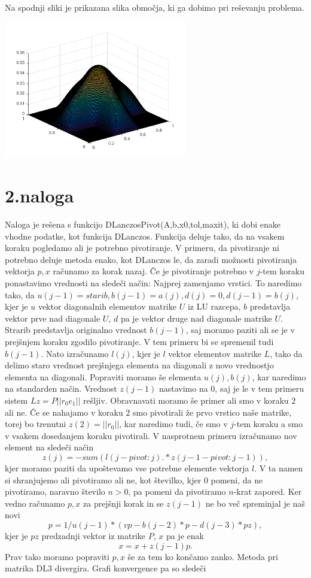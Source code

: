 \documentclass[11pt]{article} %
\begin{document}
Na spodnji sliki je prikazana slika območja, ki ga dobimo pri reševanju problema.

\includegraphics[width=0.6\textwidth]{slika1}

\section{2.naloga}

Naloga je rešena s funkcijo DLanczosPivot(A,b,x0,tol,maxit), ki dobi enake vhodne podatke, kot funkcija DLanczos. Funkcija deluje tako, da na vsakem koraku pogledamo ali je potrebno pivotiranje. V primeru, da pivotiranje ni potrebno deluje metoda enako, kot DLanczos le, da zaradi možnosti pivotiranja vektorja $p,x$ računamo za korak nazaj. Če je pivotiranje potrebno v $j$-tem koraku ponastavimo vrednosti na sledeči način:
Najprej zamenjamo vrstici. To naredimo tako, da
$u(j-1) = starib, b(j-1) = a(j), d(j) = 0, d(j-1)= b(j)$, kjer je $u$ vektor diagonalnih elementov matrike $U$ iz LU razcepa, $b$ predstavlja vektor prve nad diagonale $U$, $d$ pa je vektor druge nad diagonale matrike $U$. Strarib predstavlja originalno vrednost $b(j-1)$, saj moramo paziti ali se je v prejšnjem koraku zgodilo pivotiranje. V tem primeru bi se spremenil tudi $b(j-1)$. Nato izračunamo $l(j)$, kjer je $l$ vektor elementov matrike $L$, tako da delimo staro vrednost prejšnjega elementa na diagonali z novo vrednostjo elementa
na diagonali. Popraviti moramo še elementa $u(j),b(j)$, kar naredimo na standarden način. Vrednost $z(j-1)$ nastavimo na $0$, saj je le v tem primeru sistem $Lz=P||r_0e_1||$ rešljiv. Obravnavati moramo še primer ali smo v koraku $2$ ali ne. Če se nahajamo v koraku $2$ smo pivotirali že prvo vrstico naše matrike, torej bo trenutni $z(2)=||r_0||$, kar naredimo tudi, če smo v $j$-tem koraku a smo v vsakem dosedanjem koraku pivotirali. V nasprotnem primeru izračunamo nov element na sledeči način
$$z(j) = -sum(l(j-pivot:j).*z(j-1-pivot:j-1)),$$
kjer moramo paziti da upoštevamo vse potrebne elemente vektorja $l$. V ta namen si shranjujemo ali pivotiramo ali ne, kot številko, kjer $0$ pomeni, da ne pivotiramo, naravno število $n>0$, pa pomeni da pivotiramo $n$-krat zapored. Ker vedno računamo $p,x$ za prejšnji korak in se $z(j-1)$ ne bo več spreminjal je naš novi
$$p = 1/u(j-1)*(vp - b(j-2)*p-d(j-3)*pz),$$
kjer je $pz$ predzadnji vektor iz matrike $P$, $x$ pa je enak
$$x = x + z(j-1)p.$$
Prav tako moramo popraviti $p,x$ še za tem ko končamo zanko.
Metoda pri matrika DL3 divergira. Grafi konvergence pa so sledeči
\end{document}
